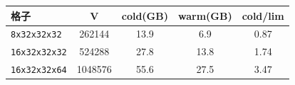 \begin{tabular}{lcccc}
\hline
格子 & V & cold(GB) & warm(GB) & cold/lim \\
\hline
\texttt{8x32x32x32} & 262144 & 13.9 & 6.9 & 0.87 \\
\texttt{16x32x32x32} & 524288 & 27.8 & 13.8 & 1.74 \\
\texttt{16x32x32x64} & 1048576 & 55.6 & 27.5 & 3.47 \\
\hline
\end{tabular}
